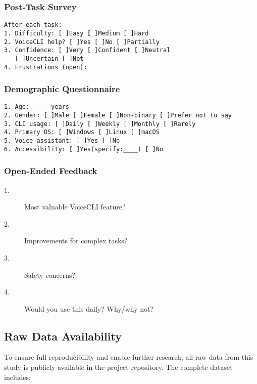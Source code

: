 \documentclass[a4paper,12pt]{article}
\begin{document}
\subsubsection*{Post-Task Survey}
\begin{verbatim}
After each task: 
1. Difficulty: [ ]Easy [ ]Medium [ ]Hard
2. VoiceCLI help? [ ]Yes [ ]No [ ]Partially
3. Confidence: [ ]Very [ ]Confident [ ]Neutral 
   [ ]Uncertain [ ]Not
4. Frustrations (open):
\end{verbatim}

\subsubsection*{Demographic Questionnaire}
\begin{verbatim}
1. Age: ____ years  
2. Gender: [ ]Male [ ]Female [ ]Non-binary [ ]Prefer not to say
3. CLI usage: [ ]Daily [ ]Weekly [ ]Monthly [ ]Rarely
4. Primary OS: [ ]Windows [ ]Linux [ ]macOS
5. Voice assistant: [ ]Yes [ ]No  
6. Accessibility: [ ]Yes(specify:____) [ ]No
\end{verbatim}

\subsubsection*{Open-Ended Feedback}

\begin{description}
\item[1.] {Most valuable VoiceCLI feature?}
\item[2.] {Improvements for complex tasks?}
\item[3.] {Safety concerns?}
\item[4.] {Would you use this daily? Why/why not?}
\end{description}

\subsection*{Raw Data Availability}
\label{sec:raw-data}

To ensure full reproducibility and enable further research, all raw data from this study is publicly available in the project repository. The complete dataset includes:
\end{document}
